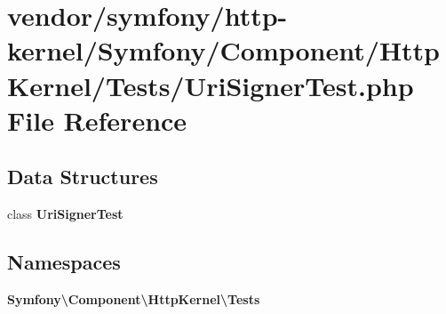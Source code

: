 \section{vendor/symfony/http-\/kernel/\+Symfony/\+Component/\+Http\+Kernel/\+Tests/\+Uri\+Signer\+Test.php File Reference}
\label{_uri_signer_test_8php}
\subsection*{Data Structures}
\begin{DoxyCompactItemize}
\item 
class {\bf Uri\+Signer\+Test}
\end{DoxyCompactItemize}
\subsection*{Namespaces}
\begin{DoxyCompactItemize}
\item 
 {\bf Symfony\textbackslash{}\+Component\textbackslash{}\+Http\+Kernel\textbackslash{}\+Tests}
\end{DoxyCompactItemize}
